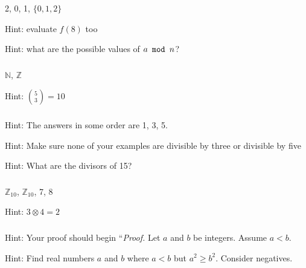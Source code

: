 \subsubsection*{ \answers}
\begin{apart}
    \item 2, 0, 1, $\{0,1,2\}$
    \item Hint: evaluate $f(8)$ too
    \item Hint: what are the possible values of $a \texttt{ mod } n$?
\end{apart}

\subsubsection*{ \answers}
\begin{apart}
    \item $\mathbb{N}$, $\mathbb{Z}$
    \item Hint: $\binom{5}{3}=10$
\end{apart}

\subsubsection*{ \answers}
\begin{apart}
    \item Hint: The answers in some order are 1, 3, 5.
    \item Hint: Make sure none of your examples are divisible by three or divisible by five
    \item Hint: What are the divisors of 15?
\end{apart}

\subsubsection*{ \answers}
\begin{apart}
    \item $\mathbb{Z}_{10}$, $\mathbb{Z}_{10}$, 7, 8
    \item Hint: $3 \otimes 4 = 2$
\end{apart}

\subsubsection*{ \answers}
\begin{apart}
    \item Hint: Your proof should begin ``\emph{Proof.} Let $a$ and $b$ be integers.  Assume $a < b$.
    \item Hint: Find real numbers $a$ and $b$ where $a < b$ but $a^2 \ge b^2$. Consider negatives.
\end{apart}

